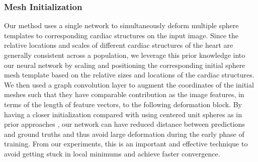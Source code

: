 \documentclass[times,review,preprint,authoryear]{elsarticle}
\begin{document}
\subsubsection{Mesh Initialization}
Our method uses a single network to simultaneously deform multiple sphere templates to corresponding cardiac structures on the input image. Since the relative locations and scales of different cardiac structures of the heart are generally consistent across a population, we leverage this prior knowledge into our neural network by scaling and positioning the corresponding initial sphere mesh template based on the relative sizes and locations of the cardiac structures. We then used a graph convolution layer to augment the coordinates of the initial meshes such that they have comparable contribution as the image features, in terms of the length of feature vectors, to the following deformation block.  By having a closer initialization compared with using centered unit spheres as in prior approaches \citep{Voxel2Mesh, Pixel2Mesh}, our network can have reduced distance between predictions and ground truths and thus avoid large deformation during the early phase of training. From our experiments, this is an important and effective technique to avoid getting stuck in local minimums and achieve faster convergence. 
\end{document}
